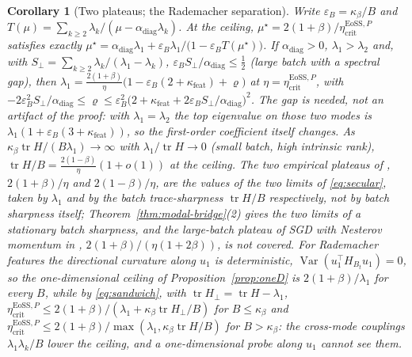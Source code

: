 \documentclass[11pt]{article}
\newtheorem{corollary}[theorem]{Corollary}
\theoremstyle{remark}
\newcommand{\etacrit}{\eta_{\mathrm{crit}}}
\newcommand{\Var}{\operatorname{Var}}
\newcommand{\tr}{\operatorname{tr}}
\begin{document}
\begin{corollary}[Two plateaus; the Rademacher separation]\label{cor:plateaus}
Write $\varepsilon_B=\kappa_\beta/B$ and $T(\mu)=\sum_{k\ge2}\lambda_k/(\mu-\alpha_{\mathrm{diag}}\lambda_k)$. At the ceiling, $\mu^\star=2(1+\beta)/\etacrit^{\mathrm{EoSS},P}$ satisfies exactly $\mu^\star=\alpha_{\mathrm{diag}}\lambda_1+\varepsilon_B\lambda_1/\big(1-\varepsilon_BT(\mu^\star)\big)$. If $\alpha_{\mathrm{diag}}>0$, $\lambda_1>\lambda_2$ and, with $S_\perp=\sum_{k\ge2}\lambda_k/(\lambda_1-\lambda_k)$, $\varepsilon_BS_\perp/\alpha_{\mathrm{diag}}\le\frac12$ (large batch with a spectral gap), then $\lambda_1=\frac{2(1+\beta)}{\eta}\big(1-\varepsilon_B(2+\kappa_{\mathrm{feat}})+\varrho\big)$ at $\eta=\etacrit^{\mathrm{EoSS},P}$, with $-2\varepsilon_B^2S_\perp/\alpha_{\mathrm{diag}}\le\varrho\le\varepsilon_B^2\big(2+\kappa_{\mathrm{feat}}+2\varepsilon_BS_\perp/\alpha_{\mathrm{diag}}\big)^2$. The gap is needed, not an artifact of the proof: with $\lambda_1=\lambda_2$ the top eigenvalue on those two modes is $\lambda_1(1+\varepsilon_B(3+\kappa_{\mathrm{feat}}))$, so the first-order coefficient itself changes. As $\kappa_\beta\tr H/(B\lambda_1)\to\infty$ with $\lambda_1/\tr H\to0$ (small batch, high intrinsic rank), $\tr H/B=\frac{2(1-\beta)}{\eta}(1+o(1))$ at the ceiling. The two empirical plateaus of \citet[eqs.~1--2]{andreyev2026momentum}, $2(1+\beta)/\eta$ and $2(1-\beta)/\eta$, are the values of the two limits of \eqref{eq:secular}, taken by $\lambda_1$ and by the batch trace-sharpness $\tr H/B$ respectively, not by batch sharpness itself; Theorem~\ref{thm:modal-bridge}(2) gives the two limits of a stationary batch sharpness, and the large-batch plateau of SGD with Nesterov momentum in \citet{andreyev2026momentum}, $2(1+\beta)/(\eta(1+2\beta))$, is not covered. For Rademacher features the directional curvature along $u_1$ is deterministic, $\Var(u_1^\top H_{B_t}u_1)=0$, so the one-dimensional ceiling of Proposition~\ref{prop:oneD} is $2(1+\beta)/\lambda_1$ for every $B$, while by \eqref{eq:sandwich}, with $\tr H_\perp=\tr H-\lambda_1$, $\etacrit^{\mathrm{EoSS},P}\le2(1+\beta)/(\lambda_1+\kappa_\beta\tr H_\perp/B)$ for $B\le\kappa_\beta$ and $\etacrit^{\mathrm{EoSS},P}\le2(1+\beta)/\max(\lambda_1,\kappa_\beta\tr H/B)$ for $B>\kappa_\beta$: the cross-mode couplings $\lambda_1\lambda_k/B$ lower the ceiling, and a one-dimensional probe along $u_1$ cannot see them.
\end{corollary}
\end{document}
